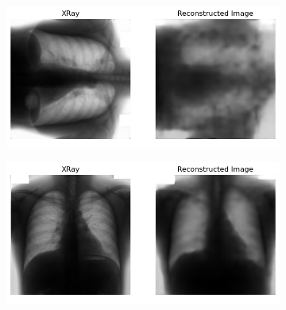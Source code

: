 \begin{figure}[htbp]
\begin{subfigure}{0.9\linewidth}
        \caption{ }
        \label{fig:unsup-orienation-down}
    \end{subfigure}
    \begin{subfigure}{0.9\linewidth}
        \centering
        \includegraphics[width=\linewidth]{../plots/unsupervised-orientation/result-left.png}
        \caption{ }
        \label{fig:unsup-orienation-left}
    \end{subfigure}
    \begin{subfigure}{0.9\linewidth}
        \centering
        \includegraphics[width=\linewidth]{../plots/unsupervised-orientation/result-trained-xrays.png}
        \caption{ }
        \label{fig:unsup-trained-image}
    \end{subfigure}
  \end{figure}


